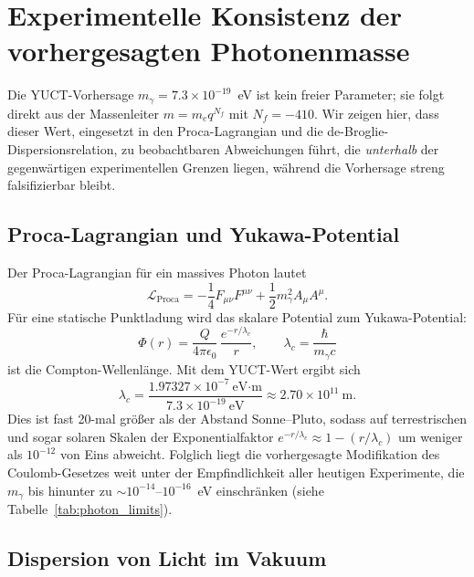 \documentclass[12pt,a4paper]{article}
\begin{document}
	\clearpage
	\section{Experimentelle Konsistenz der vorhergesagten Photonenmasse}
	\label{sec:photon_consistency}
	
	Die YUCT-Vorhersage \(m_\gamma = 7.3\times10^{-19}\)~eV ist kein freier Parameter; sie folgt direkt aus der
	Massenleiter \(m = m_e q^{N_f}\) mit \(N_f = -410\). Wir zeigen hier, dass dieser Wert, eingesetzt in den
	Proca-Lagrangian und die de-Broglie-Dispersionsrelation, zu beobachtbaren Abweichungen führt, die
	\emph{unterhalb} der gegenwärtigen experimentellen Grenzen liegen, während die Vorhersage streng falsifizierbar bleibt.
	
	\subsection{Proca-Lagrangian und Yukawa-Potential}
	
	Der Proca-Lagrangian für ein massives Photon lautet
	\[
	\mathcal{L}_{\text{Proca}} = -\frac14 F_{\mu\nu}F^{\mu\nu} + \frac12 m_\gamma^2 A_\mu A^\mu .
	\]
	Für eine statische Punktladung wird das skalare Potential zum Yukawa-Potential:
	\[
	\Phi(r) = \frac{Q}{4\pi\epsilon_0}\,\frac{e^{-r/\lambda_c}}{r},
	\qquad
	\lambda_c = \frac{\hbar}{m_\gamma c}
	\]
	ist die Compton-Wellenlänge. Mit dem YUCT-Wert ergibt sich
	\[
	\lambda_c = \frac{1.97327\times10^{-7}~\text{eV·m}}{7.3\times10^{-19}~\text{eV}}
	\approx 2.70\times10^{11}~\text{m}.
	\]
	Dies ist fast 20-mal größer als der Abstand Sonne–Pluto, sodass auf terrestrischen und sogar solaren Skalen
	der Exponentialfaktor \(e^{-r/\lambda_c}\approx 1 - (r/\lambda_c)\) um weniger als \(10^{-12}\) von Eins abweicht.
	Folglich liegt die vorhergesagte Modifikation des Coulomb-Gesetzes weit unter der Empfindlichkeit aller heutigen
	Experimente, die \(m_\gamma\) bis hinunter zu \(\sim 10^{-14}\)–\(10^{-16}\)~eV einschränken (siehe Tabelle~\ref{tab:photon_limits}).
	
	\subsection{Dispersion von Licht im Vakuum}
	
\end{document}
